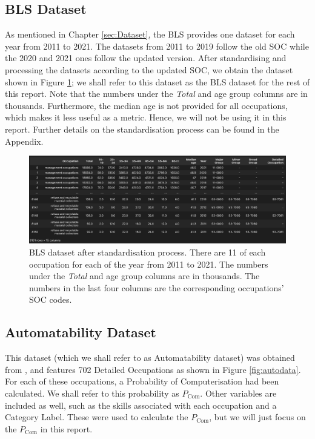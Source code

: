 \documentclass[11pt]{article}
\begin{document}
\subsection{BLS Dataset}
\label{subsec: BLS}
As mentioned in Chapter \ref{sec:Dataset}, the BLS provides one dataset for each year from 2011 to 2021. The datasets from 2011 to 2019 follow the old SOC while the 2020 and 2021 ones follow the updated version. After standardising and processing the datasets according to the updated SOC, we obtain the dataset shown in Figure \ref{fig:df}; we shall refer to this dataset as the BLS dataset for the rest of this report. Note that the numbers under the \emph{Total} and age group columns are in thousands. Furthermore, the median age is not provided for all occupations, which makes it less useful as a metric. Hence, we will not be using it in this report. Further details on the standardisation process can be found in the Appendix.

\begin{figure}[!htb]
    \centering
    \includegraphics[width=15cm]{Figures/joint_processed.png}
    \caption{BLS dataset after standardisation process. There are 11 of each occupation for each of the year from 2011 to 2021. The numbers under the \emph{Total} and age group columns are in thousands. The numbers in the last four columns are the corresponding occupations' SOC codes.}
	\label{fig:df}
\end{figure}



\subsection{Automatability Dataset}
\label{subsec:Automatability Dataset}

This dataset (which we shall refer to as Automatability dataset) was obtained from \cite{osborne2017future}, and features 702 Detailed Occupations as shown in Figure \ref{fig:autodata}. For each of these occupations, a Probability of Computerisation had been calculated. We shall refer to this probability as $P_{\text{Com}}$. Other variables are included as well, such as the skills associated with each occupation and a Category Label. These were used to calculate the $P_{\text{Com}}$, but we will just focus on the $P_{\text{Com}}$ in this report.
\end{document}
